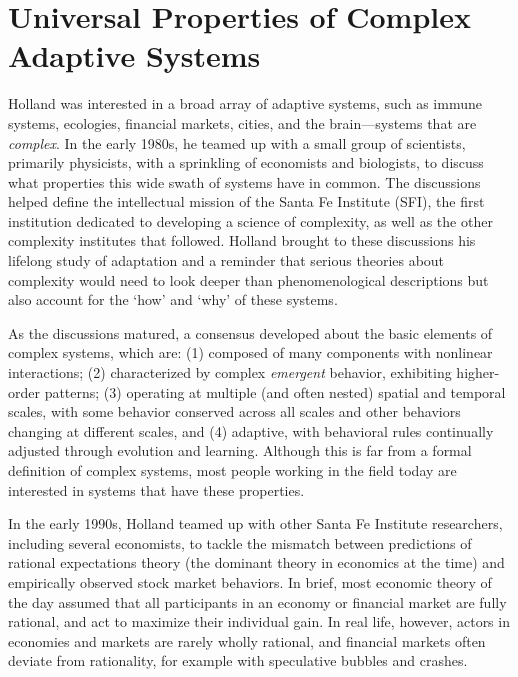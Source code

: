 \documentclass{sig-alternate}
\begin{document}
\section{Universal Properties of Complex Adaptive Systems}

Holland was interested in a broad array of adaptive systems, such as immune
systems, ecologies, financial markets, cities, and the brain---systems
that are \emph{complex}.  In the early 1980s, he teamed up with a small
group of scientists, primarily physicists, with a sprinkling of
economists and biologists, to discuss what properties this wide swath of systems
have in common.  The discussions helped define the intellectual mission
of the Santa Fe Institute (SFI), the first institution dedicated to
developing a science of complexity, as well as the other complexity institutes that followed.
Holland brought to these discussions his lifelong study of
adaptation and a reminder that serious theories about complexity would
need to look deeper than phenomenological descriptions but also
account for the `how' and `why' of these systems.

As the discussions matured, a consensus developed about the basic
elements of complex systems, which are: (1) 
composed of many
components with nonlinear interactions; (2) 
characterized by complex \emph{emergent} behavior, exhibiting
higher-order patterns; (3) 
operating at multiple (and often
nested) spatial and temporal scales, with some behavior 
conserved across all scales and other behaviors changing at different
scales, and (4) 
adaptive, with 
behavioral rules continually adjusted through evolution and learning.  Although this
is far from a formal definition of complex systems, most people
working in the field today are interested in systems that have these
properties.


In the early 1990s, Holland teamed up with other Santa Fe Institute researchers,
including several economists, to tackle the mismatch between predictions
of rational expectations theory (the dominant theory in economics at the time) 
and empirically observed stock market behaviors. 
In brief, most
economic theory of the day assumed that all participants in an economy
or financial market are fully rational, and act to maximize their
individual gain.  In real life, however, actors in economies
and markets are rarely wholly rational, and financial markets often deviate
from rationality, for example with speculative bubbles and crashes.
\end{document}
